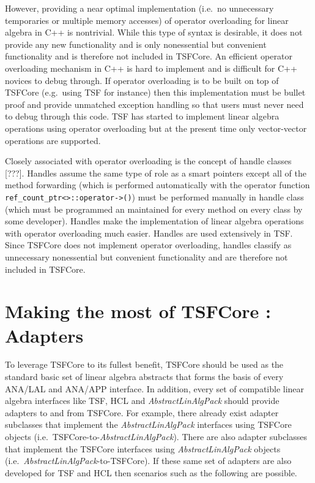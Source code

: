 \documentclass[10pt,fleqn]{article}
\begin{document}
However, providing a near optimal implementation (i.e.~no unnecessary
temporaries or multiple memory accesses) of operator overloading for
linear algebra in C++ is nontrivial.  While this type of syntax is
desirable, it does not provide any new functionality and is only
nonessential but convenient functionality and is therefore not included in TSFCore.
An efficient operator overloading mechanism in C++ is hard to
implement and is difficult for C++ novices to debug through.  If
operator overloading is to be built on top of TSFCore (e.g.~using TSF for
instance) then this implementation must be bullet proof and provide
unmatched exception handling so that users must never need to debug
through this code.  TSF has started to implement linear algebra
operations using operator overloading but at the present time only
vector-vector operations are supported.

Closely associated with operator overloading is the concept of handle
classes [???].  Handles assume the same type of role as a smart
pointers except all of the method forwarding (which is performed
automatically with the operator function
\texttt{ref\_count\_ptr<>\-::operator->()}) must be performed manually
in handle class (which must be programmed an maintained for every
method on every class by some developer).  Handles make the
implementation of linear algebra operations with operator overloading
much easier.  Handles are used extensively in TSF.  Since TSFCore does
not implement operator overloading, handles classify as unnecessary
nonessential but convenient functionality and are therefore not included in TSFCore.

%
\section{Making the most of TSFCore : Adapters}
\label{tsfcore:sec:adapters}
%

To leverage TSFCore to its fullest benefit, TSFCore should be used as the
standard basic set of linear algebra abstracts that forms the basis of
every ANA/LAL and ANA/APP interface.  In addition, every set of
compatible linear algebra interfaces like TSF, HCL and
\textit{AbstractLinAlgPack} should provide adapters to and from TSFCore.
For example, there already exist adapter subclasses that implement the
\textit{AbstractLinAlgPack} interfaces using TSFCore objects
(i.e.~TSFCore-to-\textit{AbstractLinAlgPack}).  There are also adapter
subclasses that implement the TSFCore interfaces using
\textit{AbstractLinAlgPack} objects
(i.e.~\textit{AbstractLinAlgPack}-to-TSFCore).  If these same set of
adapters are also developed for TSF and HCL then scenarios such as the
following are possible.
\end{document}
